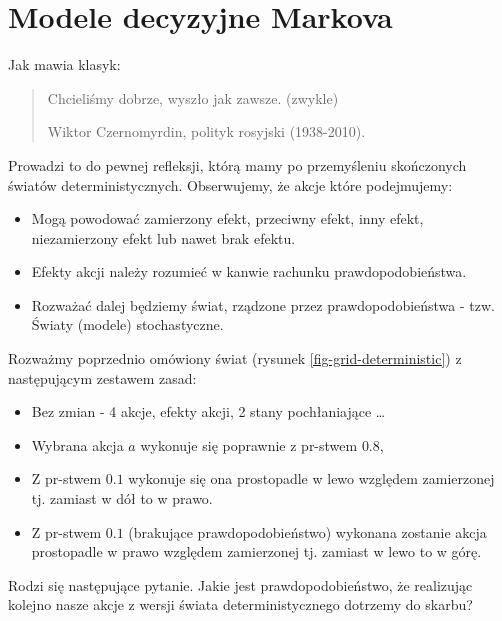 \documentclass[10pt,a4paper]{book}
\begin{document}
\section{Modele decyzyjne Markova}

Jak mawia klasyk:

\begin{quotation}
Chcieliśmy dobrze, wyszło jak zawsze. (zwykle)\\
\begin{flushright}
Wiktor Czernomyrdin, polityk rosyjski (1938-2010).
\end{flushright}
\end{quotation}

Prowadzi to do pewnej refleksji, którą mamy po przemyśleniu skończonych światów deterministycznych. Obserwujemy, że akcje które podejmujemy:
\begin{itemize}
\item Mogą powodować zamierzony efekt, przeciwny efekt, inny efekt, niezamierzony efekt lub nawet brak efektu.
\item Efekty akcji należy rozumieć w kanwie rachunku prawdopodobieństwa.
\item Rozważać dalej będziemy świat, rządzone przez prawdopodobieństwa - tzw. {Światy (modele) stochastyczne}.
\end{itemize}

\begin{problem*}
Rozważmy poprzednio omówiony świat (rysunek \ref{fig-grid-deterministic}) z następującym zestawem zasad:

\begin{itemize}
\item Bez zmian - 4 akcje, efekty akcji, 2 stany pochłaniające \ldots
\item Wybrana akcja $a$ wykonuje się poprawnie z pr-stwem $0.8$,
\item Z pr-stwem $0.1$ wykonuje się ona prostopadle w lewo względem zamierzonej tj. zamiast w dół to w prawo.
\item Z pr-stwem $0.1$ (brakujące prawdopodobieństwo) wykonana zostanie akcja prostopadle w prawo względem zamierzonej tj. zamiast w lewo to w górę.
\end{itemize}
\end{problem*}

\begin{exercise*}
Rodzi się następujące pytanie. Jakie jest prawdopodobieństwo, że realizując kolejno nasze akcje z wersji świata deterministycznego dotrzemy do skarbu?
\end{exercise*}
\end{document}
